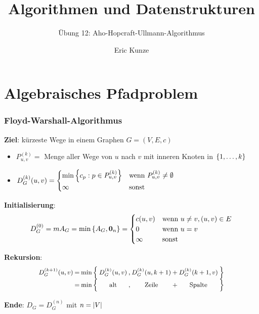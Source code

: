 \documentclass{beamer}
\begin{document}
	
	\title{Algorithmen und Datenstrukturen}
	\subtitle{Übung 12: Aho-Hopcraft-Ullmann-Algorithmus}
	\author{Eric Kunze}
	\date{}

	\maketitle


\section{Algebraisches Pfadproblem}

\begin{frame} \frametitle{Floyd-Warshall-Algorithmus}
	\footnotesize
	\textbf{Ziel}: kürzeste Wege in einem Graphen $G=(V,E,c)$
	\begin{itemize}
		\item $P^{(k)}_{u,v} =$ Menge aller Wege von $u$ nach $v$ mit inneren Knoten in $\left\{ 1, \dots, k \right\}$
		\item $D_G^{(k)} (u,v) = \begin{cases}
			\min\left\{ c_p : p \in P_{u,v}^{(k)} \right\} & \text{wenn } P_{u,v}^{(k)} \neq \emptyset \\
			\infty & \text{sonst}
		\end{cases}$
	\end{itemize}

	\textbf{Initialisierung}: 
	\vspace{-\baselineskip}
	\begin{equation*}
		D_G^{(0)} = mA_G = \min\left\{ A_G, \mathbf{0}_n \right\} = \begin{cases}
			c(u,v) & \text{wenn } u \neq v, (u,v) \in E \\
			0 & \text{wenn } u = v \\
			\infty & \text{sonst}
		\end{cases}
	\end{equation*}
	
	\textbf{Rekursion}:
		\begin{equation*}
			\small
			\setlength{\arraycolsep}{1pt}
			\begin{array}{rclcccccl}
				D_G^{(k+1)}(u,v) &=& \min \Big\{ & D_G^{(k)}(u,v) & , & D_G^{(k)}(u,k+1) & + & D_G^{(k)}(k+1,v) & \Big\}  \\
				&=& \min \Big\{ & \text{alt} & , & \text{Zeile} & + & \text{Spalte} & \Big\}
			\end{array}
		\end{equation*}
	
	\textbf{Ende}: $D_G = D_G^{(n)}$ mit $n = \left| V \right|$
\end{frame}
\end{document}
